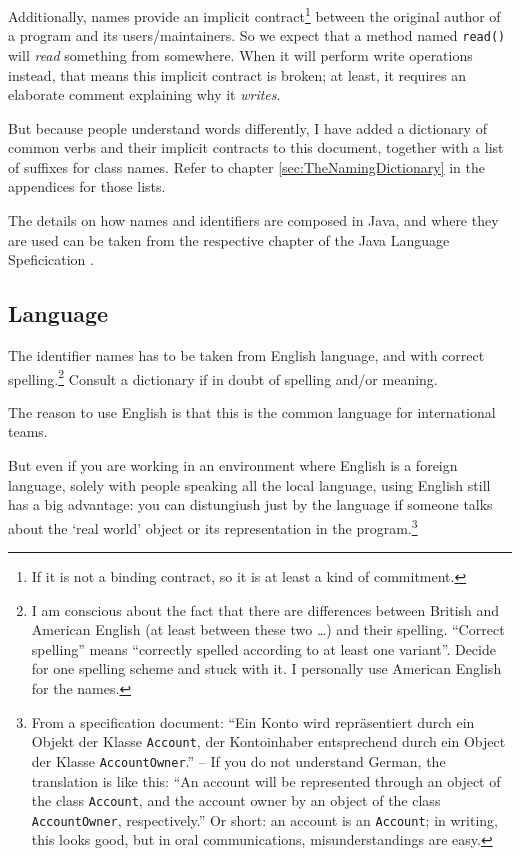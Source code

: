 \documentclass[12pt,a4paper,titlepage, parskip=half, headsepline, footsepline, cleardoubleplain]{scrbook}
\begin{document}
Additionally, names provide an implicit contract\footnote{If it is not a binding contract, so it is at least a kind of commitment.} between the original author of a program and its users/maintainers. So we expect that a method named \lstinline|read()| will \textit{read} something from somewhere. When it will perform write operations instead, that means this implicit contract is broken; at least, it requires an elaborate comment explaining why it \textit{writes}.

But because people understand words differently, I have added a dictionary of common verbs and their implicit contracts to this document, together with a list of suffixes for class names. Refer to chapter \vref{sec:TheNamingDictionary} in the appendices for those lists.

The details on how names and identifiers are composed in Java, and where they are used can be taken from the respective chapter of the Java Language Speficication \autocite{ORACLE_DOC_LANGUAGE_SPECIFICATION:NamesAndIdentifiers}.

\subsection{Language}
The identifier names has to be taken from English language, and with correct spelling.\footnote{I am conscious about the fact that there are differences between British and American English (at least between these two …) and their spelling. “Correct spelling” means “correctly spelled according to at least one variant”. Decide for one spelling scheme and stuck with it. I personally use American English for the names.} Consult a dictionary if in doubt of spelling and/or meaning.

The reason to use English is that this is the common language for international teams.

But even if you are working in an environment where English is a foreign language, solely with people speaking all the local language, using English still has a big advantage: you can distungiush just by the language if someone talks about the ‘real world’ object or its representation in the program.\footnote{From a specification document: “Ein Konto wird repräsentiert durch ein Objekt der Klasse \lstinline|Account|, der Kontoinhaber entsprechend durch ein Object der Klasse \lstinline|AccountOwner|.” – If you do not understand German, the translation is like this: “An account will be represented through an object of the class \lstinline|Account|, and the account owner by an object of the class \lstinline|AccountOwner|, respectively.” Or short: an account is an \lstinline|Account|; in writing, this looks good, but in oral communications, misunderstandings are easy. }
\end{document}
